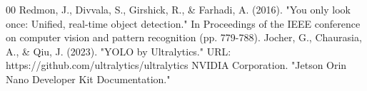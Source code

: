 \documentclass[conference,onecolumn]{IEEEtran}
\begin{document}
\begin{thebibliography}{00}
 Redmon, J., Divvala, S., Girshick, R., \& Farhadi, A. (2016). "You only look once: Unified, real-time object detection." In Proceedings of the IEEE conference on computer vision and pattern recognition (pp. 779-788).
 Jocher, G., Chaurasia, A., \& Qiu, J. (2023). "YOLO by Ultralytics." URL: https://github.com/ultralytics/ultralytics
 NVIDIA Corporation. "Jetson Orin Nano Developer Kit Documentation." 
\end{thebibliography}
\end{document}
